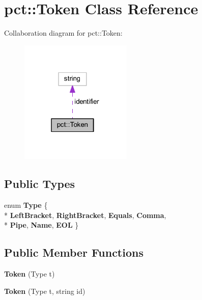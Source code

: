 \hypertarget{classpct_1_1_token}{\section{pct\-:\-:Token Class Reference}
\label{classpct_1_1_token}
}


Collaboration diagram for pct\-:\-:Token\-:
\nopagebreak
\begin{figure}[H]
\begin{center}
\leavevmode
\includegraphics[width=151pt]{classpct_1_1_token__coll__graph}
\end{center}
\end{figure}
\subsection*{Public Types}
\begin{DoxyCompactItemize}
\item 
enum {\bfseries Type} \{ \\*
{\bfseries Left\-Bracket}, 
{\bfseries Right\-Bracket}, 
{\bfseries Equals}, 
{\bfseries Comma}, 
\\*
{\bfseries Pipe}, 
{\bfseries Name}, 
{\bfseries E\-O\-L}
 \}
\end{DoxyCompactItemize}
\subsection*{Public Member Functions}
\begin{DoxyCompactItemize}
\item 
\hypertarget{classpct_1_1_token_a1e704c3bde9b1e03aa06e4e0cd24b9f9}{{\bfseries Token} (Type t)}\label{classpct_1_1_token_a1e704c3bde9b1e03aa06e4e0cd24b9f9}

\item 
\hypertarget{classpct_1_1_token_a2eb1ffd34fa3174c5698269d3603d7c8}{{\bfseries Token} (Type t, string id)}\label{classpct_1_1_token_a2eb1ffd34fa3174c5698269d3603d7c8}

\end{DoxyCompactItemize}
